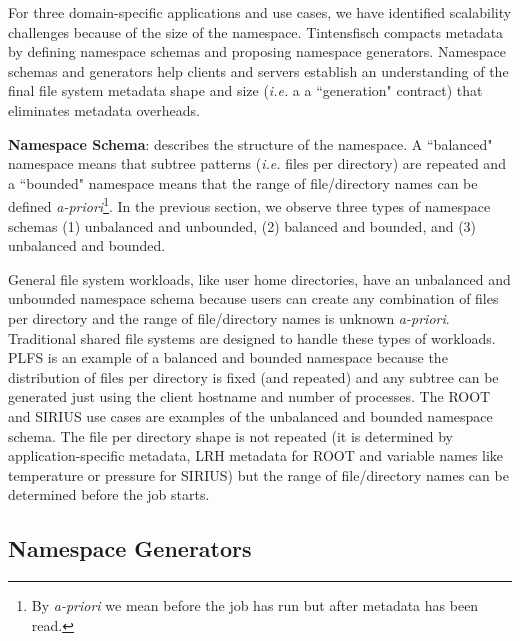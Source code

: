  


For three domain-specific applications and use cases, we have identified
scalability challenges because of the size of the namespace.  Tintensfisch
compacts metadata by defining namespace schemas and proposing namespace
generators.  Namespace schemas and generators help clients and servers
establish an understanding of the final file system metadata shape and size
({\it i.e.} a a ``generation" contract) that eliminates metadata overheads.

\textbf{Namespace Schema}: describes the structure of the namespace. A
``balanced" namespace means that subtree patterns ({\it i.e.} files per
directory) are repeated and a ``bounded" namespace means that the range of
file/directory names can be defined {\it a-priori}\footnote{By {\it a-priori}
we mean before the job has run but after metadata has been read.}.  In the
previous section, we observe three types of namespace schemas (1) unbalanced
and unbounded, (2) balanced and bounded, and (3) unbalanced and bounded.

General file system workloads, like user home directories, have an unbalanced
and unbounded namespace schema because users can create any combination of
files per directory and the range of file/directory names is unknown {\it
a-priori}. Traditional shared file systems are designed to handle these types
of workloads. PLFS is an example of a balanced and bounded namespace because
the distribution of files per directory is fixed (and repeated) and any subtree
can be generated just using the client hostname and number of processes.  The
ROOT and SIRIUS use cases are examples of the unbalanced and bounded namespace
schema. The file per directory shape is not repeated (it is determined by
application-specific metadata, LRH metadata for ROOT and variable names like
temperature or pressure for SIRIUS) but the range of file/directory names can
be determined before the job starts.

\subsection{Namespace Generators}
\label{sec:namespace-generators}

